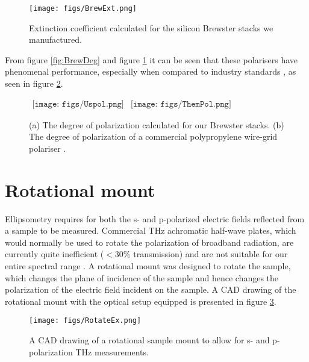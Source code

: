 \begin{figure}[H]
\begin{center}
	 \texttt{[image: figs/BrewExt.png]}
	 \caption[Extinction coefficient calculated for the silicon Brewster stacks]{Extinction coefficient calculated for the silicon Brewster stacks we manufactured.}
   \label{fig:BrewExt}
\end{center}
\end{figure}

From figure \ref{fig:BrewDeg} and figure \ref{fig:BrewExt} it can be seen that these polarisers have phenomenal performance, especially when compared to industry standards \cite{TyPol2019}, as seen in figure \ref{BrewCompo}. 

\begin{figure}[H]
                \begin{center}$
								\begin{array}{cc}
                \texttt{[image: figs/Uspol.png]}&
                \texttt{[image: figs/ThemPol.png]}
								\end{array}$
								\end{center}
	\caption[Degree of polarization comparison]{(a) The degree of polarization calculated for our Brewster stacks. (b) The degree of polarization of a commercial polypropylene wire-grid polariser \cite{TyPol2019}.}
	\label{BrewCompo}
\end{figure}

\section{Rotational mount}
\label{sec: rot}

Ellipsometry requires for both the s- and p-polarized electric fields reflected from a sample to be measured. Commercial THz achromatic half-wave plates, which would normally be used to rotate the polarization of broadband radiation, are currently quite inefficient ($<30\%$ transmission) and are not suitable for our entire spectral range \cite{TyPha2019}. A rotational mount was designed to rotate the sample, which changes the plane of incidence of the sample and hence changes the polarization of the electric field incident on the sample. A CAD drawing of the rotational mount with the optical setup equipped is presented in figure \ref{fig:RotEx}.

\begin{figure}[H]
\begin{center}
	 \texttt{[image: figs/RotateEx.png]}
	 \caption[Rotational mount mock-up]{A CAD drawing of a rotational sample mount to allow for s- and p-polarization THz measurements.}
   \label{fig:RotEx}
\end{center}
\end{figure}


